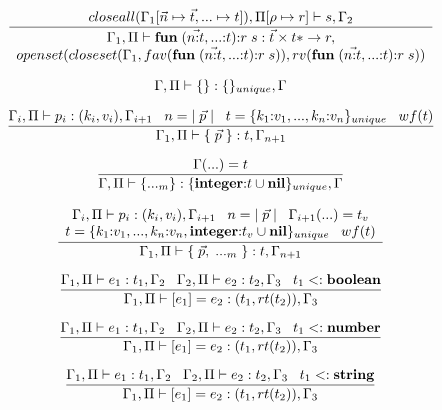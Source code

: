 \[
\dfrac{closeall(\Gamma_{1}[\vec{n} \mapsto \vec{t}, {...} \mapsto t]), \Pi[\rho \mapsto r] \vdash s, \Gamma_{2}}
      {\begin{array}{c}
       \Gamma_{1}, \Pi \vdash \mathbf{fun} \; (\vec{n{:}t},{...}{:}t){:}r \; s:\vec{t} \times t{*} \rightarrow r,\\
       openset(closeset(\Gamma_{1}, fav(\mathbf{fun} \; (\vec{n{:}t},{...}{:}t){:}r \; s)),rv(\mathbf{fun} \; (\vec{n{:}t},{...}{:}t){:}r \; s))
       \end{array}}
\]

\[
\Gamma, \Pi \vdash \{\}:\{\}_{unique}, \Gamma
\]

\[
\dfrac{\Gamma_{i}, \Pi \vdash p_{i}:(k_{i},v_{i}), \Gamma_{i+1} \;\;\;
       n = |\;\vec{p}\;| \;\;\;
       t = \{k_{1}{:}v_{1}, ..., k_{n}{:}v_{n}\}_{unique} \;\;\;
       wf(t)}
      {\Gamma_{1}, \Pi \vdash \{\;\vec{p}\;\}:t, \Gamma_{n+1}}
\]

\[
\dfrac{\Gamma({...}) = t}
      {\Gamma, \Pi \vdash \{{...}_{m}\}:\{\mathbf{integer}{:}t \cup \mathbf{nil}\}_{unique}, \Gamma}
\]

\[
\dfrac{\begin{array}{c}
       \Gamma_{i}, \Pi \vdash p_{i}:(k_{i},v_{i}), \Gamma_{i+1} \;\;\;
       n = |\;\vec{p}\;| \;\;\;
       \Gamma_{i+1}({...}) = t_{v}\\
       t = \{k_{1}{:}v_{1}, ..., k_{n}{:}v_{n}, \mathbf{integer}{:}t_{v} \cup \mathbf{nil}\}_{unique} \;\;\;
       wf(t)
       \end{array}}
      {\Gamma_{1}, \Pi \vdash \{\;\vec{p},\;{...}_{m}\;\}:t, \Gamma_{n+1}}
\]

\[
\dfrac{\Gamma_{1}, \Pi \vdash e_{1}:t_{1}, \Gamma_{2} \;\;\;
       \Gamma_{2}, \Pi \vdash e_{2}:t_{2}, \Gamma_{3} \;\;\;
       t_{1} <: \mathbf{boolean}}
      {\Gamma_{1}, \Pi \vdash [e_{1}] = e_{2}: (t_{1},rt(t_{2})), \Gamma_{3}}
\]

\[
\dfrac{\Gamma_{1}, \Pi \vdash e_{1}:t_{1}, \Gamma_{2} \;\;\;
       \Gamma_{2}, \Pi \vdash e_{2}:t_{2}, \Gamma_{3} \;\;\;
       t_{1} <: \mathbf{number}}
      {\Gamma_{1}, \Pi \vdash [e_{1}] = e_{2}: (t_{1},rt(t_{2})), \Gamma_{3}}
\]

\[
\dfrac{\Gamma_{1}, \Pi \vdash e_{1}:t_{1}, \Gamma_{2} \;\;\;
       \Gamma_{2}, \Pi \vdash e_{2}:t_{2}, \Gamma_{3} \;\;\;
       t_{1} <: \mathbf{string}}
      {\Gamma_{1}, \Pi \vdash [e_{1}] = e_{2}: (t_{1},rt(t_{2})), \Gamma_{3}}
\]


